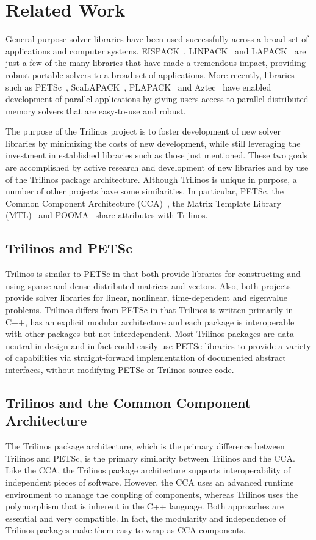 \documentclass[acmtoms,acmnow]{acmtrans2m}
\begin{document}
\section{Related Work}
\label{Sect:RelatedWork}
General-purpose solver libraries have been used successfully across 
a broad set of applications and computer systems.  EISPACK~\cite{eispack}, 
LINPACK~\cite{linpack} and LAPACK~\cite{lapack} are just a few of
the many libraries that have made a tremendous impact, providing robust 
portable solvers to a broad set of applications.  More recently, libraries 
such as PETSc~\cite{petsc-home-page,petsc-manual,petsc-efficient}, 
ScaLAPACK~\cite{scalapack}, PLAPACK~\cite{plapack} 
and Aztec~\cite{Aztec2.1} have enabled development of parallel
applications by giving users access to parallel distributed 
memory solvers that are easy-to-use and robust.

The purpose of the Trilinos project is to foster development
of new solver libraries by minimizing the costs of new development,
while still leveraging the investment in
established libraries such as those just mentioned.  These two goals
are accomplished by active research and development of new libraries
and by use of the Trilinos package architecture.  Although
Trilinos is unique in purpose, a number of other projects have some 
similarities.  In particular, PETSc, the Common Component Architecture
(CCA)~\cite{CCA-home-page}, the Matrix
Template Library (MTL)~\cite{MTL-home-page} and POOMA~\cite{POOMA}
share attributes with Trilinos.

\subsection{Trilinos and PETSc}
Trilinos is similar to PETSc in that both provide libraries for
constructing and using sparse and dense distributed matrices and
vectors.  Also, both projects provide solver libraries for linear, nonlinear,
time-dependent and eigenvalue problems.  Trilinos differs from PETSc
in that Trilinos is written primarily in C++, has an explicit
modular architecture and each package is interoperable with other
packages but not interdependent.  Most Trilinos packages are
data-neutral in design and in fact could easily use PETSc libraries to
provide a variety of capabilities via straight-forward implementation
of documented abstract interfaces, without modifying PETSc or Trilinos source code.  

\subsection{Trilinos and the Common Component Architecture}
The Trilinos package architecture, which is the primary difference between
Trilinos and PETSc,
is the primary similarity between Trilinos and the CCA.  Like the CCA,
the Trilinos
package architecture supports interoperability of independent
pieces of software.  However, the CCA uses an advanced runtime
environment to manage the coupling of components, whereas Trilinos
uses the polymorphism that is inherent in the C++ language.  Both
approaches are essential and very compatible.  In fact, the modularity
and independence of Trilinos
packages make them easy to wrap as CCA components.
\end{document}
